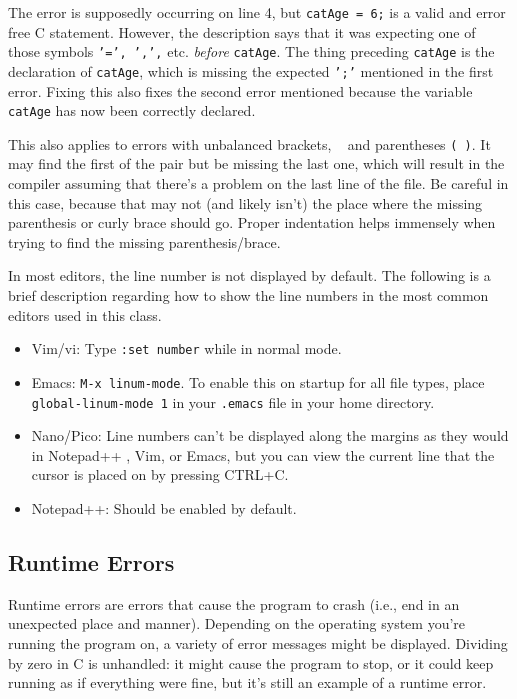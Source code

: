 \documentclass[12pt]{scrartcl}
\begin{document}
The error is supposedly occurring on line 4, but \texttt{catAge = 6;} 
is a valid and error free C statement.  However, the description says that 
it was expecting one of those symbols \texttt{'=', ',',} etc. 
\emph{before} \texttt{catAge}.  The thing preceding \texttt{catAge} 
is the declaration of \texttt{catAge}, which is missing the expected 
\texttt{';'} mentioned in the first error.  Fixing this also fixes the 
second error mentioned because the variable \texttt{catAge} 
has now been correctly declared.  

This also applies to errors with unbalanced brackets, \texttt{{ }} and 
parentheses \texttt{( )}.  It may find the first of the pair but be missing 
the last one, which will result in the compiler assuming that there's a problem 
on the last line of the file.  Be careful in this case, because that may not (and 
likely isn't) the place where the missing parenthesis or curly brace should go.  
Proper indentation helps immensely when trying to find the missing 
parenthesis/brace.

In most editors, the line number is not displayed by default.  The following is 
a brief description regarding how to show the line numbers in the most common 
editors used in this class.

\begin{itemize}
  \item Vim/vi: Type \texttt{:set number} while in normal mode.  
  \item Emacs: \texttt{M-x linum-mode}.  To enable this on startup for all file types, 
	place \texttt{global-linum-mode 1} in your \texttt{.emacs}
	file in your home directory.
  \item Nano/Pico: Line numbers can't be displayed along the margins as they would 
	in Notepad++ , Vim, or Emacs, but you can view the current line that the cursor 
	is placed on by pressing CTRL+C.  
  \item Notepad++:  Should be enabled by default.
\end{itemize}

\subsection*{Runtime Errors}

Runtime errors are errors that cause the program to crash (i.e., end in an 
unexpected place and manner).  Depending on the operating system you're 
running the program on, a variety of error messages might be displayed.  
Dividing by zero in C is unhandled: it might cause the program to stop, or 
it could keep running as if everything were fine, but it's still an example of 
a runtime error.  
\end{document}
